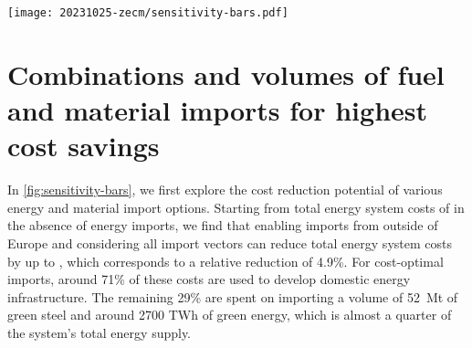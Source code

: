 




\begin{figure*}
    \texttt{[image: 20231025-zecm/sensitivity-bars.pdf]}
    \caption{\textbf{Potential for cost reductions with reduced sets of import options.}
        Subsets of available import options are sorted by ascending cost reduction potential.
        Top panel shows profile of total cost savings.
        Bottom panel shows composition and extent of imports in relation to total energy system costs.
        Percentage numbers in bar plot indicate the share of total system costs spent on domestic energy infrastructure.
        Alternative versions of this figure with higher and lower import cost assumptions are included in the supplementary material.
    }
    \label{fig:sensitivity-bars}
\end{figure*}



\section*{Combinations and volumes of fuel and material imports for highest cost savings}

In \cref{fig:sensitivity-bars}, we first explore the cost reduction potential of
various energy and material import options. Starting from total energy system
costs of  in the absence of energy imports, we find that enabling
imports from outside of Europe and considering all import vectors can reduce
total energy system costs by up to , which corresponds to a relative reduction
of 4.9\%.
For cost-optimal imports, around 71\% of these costs are used to develop domestic
energy infrastructure. The remaining 29\% are spent on importing a volume of
52~Mt of green steel and around 2700 TWh of green energy, which is almost a
quarter of the system's total energy supply.

